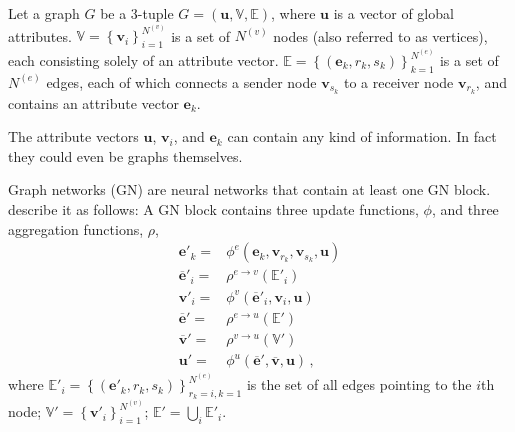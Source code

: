 Let a graph $G$ be a 3-tuple $G=\left(\bm{u},\mathbb{V},\mathbb{E}\right)$, where $\bm{u}$ is a vector of global attributes.
$\mathbb{V}=\left\{\bm{v}_i\right\}_{i=1}^{N^{(v)}}$ is a set of $N^{(v)}$ nodes (also referred to as vertices), each consisting solely of an attribute vector.
$\mathbb{E}=\left\{\left(\bm{e}_k,r_k,s_k\right)\right\}_{k=1}^{N^{(e)}}$ is a set of $N^{(e)}$ edges, each of which connects a sender node $\bm{v}_{s_k}$ to a receiver node $\bm{v}_{r_k}$, and contains an attribute vector $\bm{e}_k$.

The attribute vectors $\bm{u}$, $\bm{v}_i$, and $\bm{e}_k$ can contain any kind of information. In fact they could even be graphs themselves.

Graph networks (GN) are neural networks that contain at least one GN block. \cite{deepmind:graphnets} describe it as follows: A GN block contains three update functions, $\phi$, and three aggregation functions, $\rho$,
\begin{align}
    \bm{e}'_k=&\phi^e\left(\bm{e}_k,\bm{v}_{r_k},\bm{v}_{s_k},\bm{u}\right)\\
    \bm{\overline{e}}'_i=&\rho^{e\rightarrow v}\left(\mathbb{E}'_i\right)\\
    \bm{v}'_i=&\phi^v\left(\bm{\overline{e}}'_i,\bm{v}_i,\bm{u}\right)\\
    \bm{\overline{e}}'=&\rho^{e\rightarrow u}\left(\mathbb{E}'\right)\\
    \bm{\overline{v}}'=&\rho^{v\rightarrow u}\left(\mathbb{V}'\right)\\
    \bm{u}'=&\phi^u\left(\bm{\overline{e}}',\bm{\overline{v}},\bm{u}\right)\,,
\end{align}
where $\mathbb{E}'_i=\left\{\left(\bm{e}'_k,r_k,s_k\right)\right\}_{r_k=i,k=1}^{N^{(e)}}$ is the set of all edges pointing to the $i$th node; $\mathbb{V}'=\left\{\bm{v}'_i\right\}_{i=1}^{N^{(v)}}$; $\mathbb{E}'=\bigcup_i\mathbb{E}'_i$.

